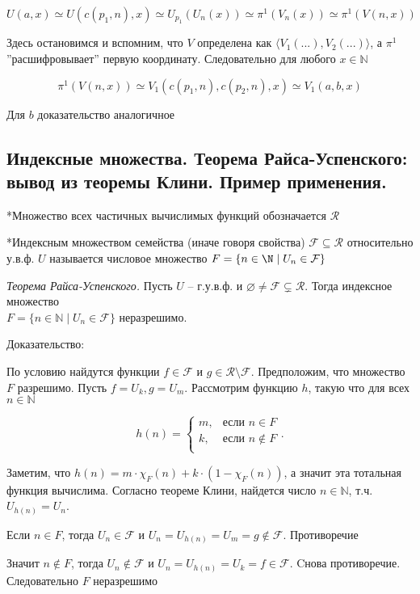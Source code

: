\documentclass[a4paper, 10pt]{article}
\newcommand{\FF}{\mathcal{F}}
\newcommand{\RR}{\mathcal{R}}
\begin{document}
$$ U(a, x) \simeq U(c(p_1, n), x) \simeq U_{p_1}(U_n(x))\simeq \pi^1(V_n(x)) \simeq \pi^1(V(n, x)) $$

Здесь остановимся и вспомним, что $V$ определена как $\langle V_1(...), V_2(...) \rangle$, а $\pi^1$ ''расшифровывает'' первую координату. Следовательно для любого $x \in \mathbb{N}$

$$\pi^1(V(n, x)) \simeq V_1(c(p_1, n), c(p_2, n), x) \simeq V_1(a, b, x)$$

Для $b$ доказательство аналогичное

\subsection{Индексные множества. Теорема Райса-Успенского: вывод из теоремы Клини.
Пример применения.}

*Множество всех частичных вычислимых функций обозначается $\RR$

*Индексным множеством семейства (иначе говоря свойства) $\FF \subseteq \RR$ относительно у.в.ф. $U$ называется числовое множество $F=\{n\in\N\mid U_n\in\FF\}$

\hfill

\textit{Теорема Райса-Успенского.} Пусть $U$ -- г.у.в.ф. и $\varnothing \ne \FF \subsetneq \RR$. Тогда индексное множество \\ $F = \{ n\in \mathbb{N} \mid U_n \in \FF \}$ неразрешимо.

Доказательство: 

По условию найдутся функции $f \in \FF$ и $g \in \RR \setminus \FF $. Предположим, что множество $F$ разрешимо. Пусть $f = U_k, g=U_m$. Рассмотрим функцию $h$, такую что для всех $n \in \mathbb{N}$

$$ h(n) = \begin{cases}
    m, & \text{если } n\in F\\
    k, & \text{если } n\notin F\\
\end{cases}. $$

Заметим, что $h(n)=m\cdot\chi_F(n)+k\cdot(1-\chi_F(n))$, а значит эта тотальная функция вычислима. Согласно теореме Клини, найдется число $n \in \mathbb{N}$, т.ч. $U_{h(n)}=U_n$.

Если $n\in F$, тогда $U_n\in \FF$ и $U_n=U_{h(n)}=U_m=g\notin\FF$. Противоречие

Значит $n\notin F$, тогда $U_n\notin \FF$ и $U_n=U_{h(n)}=U_k=f\in\FF$. Cнова противоречие. Следовательно $F$ неразрешимо

\hfill
\end{document}
